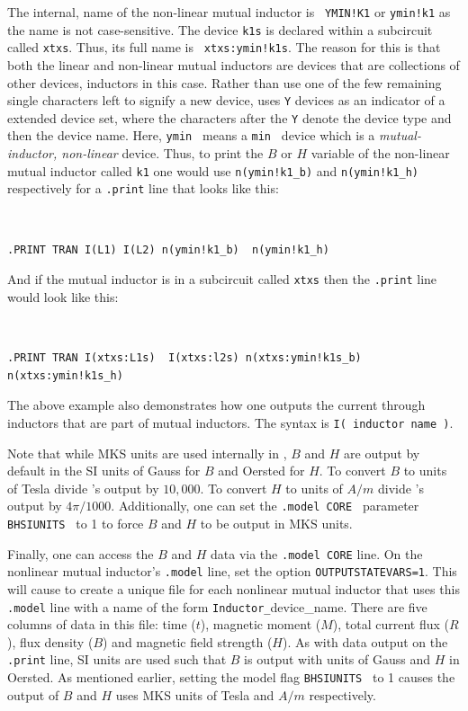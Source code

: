 The internal, \Xyce{} name of the non-linear mutual inductor is {\tt
YMIN!K1} or {\tt ymin!k1} as the name is not
case-sensitive.  The device {\tt k1s} is declared within a
subcircuit called {\tt xtxs}. Thus, its full name is {\tt
xtxs:ymin!k1s}. The reason for this is that both the linear and
non-linear mutual inductors are devices that are collections of other
devices, inductors in this case.  Rather than use one of the few
remaining single characters left to signify a new device, \Xyce{} uses
{\tt Y} devices as an indicator of a extended device set, where the
characters after the {\tt Y} denote the device type and then the device
name.  Here, {\tt ymin } means a {\tt min } device which is a {\em
mutual-inductor, non-linear} device.  Thus, to print the $B$ or $H$
variable of the non-linear mutual inductor called {\tt k1} one would
use {\tt n(ymin!k1\_b)} and {\tt n(ymin!k1\_h)}
respectively for a {\tt .print} line that looks like this:

{\tt 
\begin{verbatim}
.PRINT TRAN I(L1) I(L2) n(ymin!k1_b)  n(ymin!k1_h)  
\end{verbatim}
}

And if the mutual inductor is in a subcircuit called {\tt xtxs} then the 
{\tt .print} line would look like this:

{\tt 
\begin{verbatim}
.PRINT TRAN I(xtxs:L1s)  I(xtxs:l2s) n(xtxs:ymin!k1s_b) n(xtxs:ymin!k1s_h)
\end{verbatim}
}

The above example also demonstrates how one outputs the current through inductors 
that are part of mutual inductors.  
The syntax is {\tt I( inductor name )}.

Note that while MKS units are used internally in \Xyce{}, $B$ and $H$ are output
by default in the SI units of Gauss for $B$ and Oersted for $H$.
To convert $B$ to units of Tesla divide  \Xyce{}'s output by $10,000$.  
To convert $H$ to units of $A/m$ divide  \Xyce{}'s output by $4\pi/1000$. 
Additionally, one can set the {\tt .model CORE }
parameter {\tt BHSIUNITS } to 1 to force $B$ and $H$ to be output in MKS
units. 


Finally, one can access the $B$ and $H$ data via the {\tt .model
CORE} line. On the nonlinear mutual inductor's {\tt .model} line, set the
option {\tt OUTPUTSTATEVARS=1}. This will cause \Xyce{} to create a unique
file for each nonlinear mutual inductor that uses this {\tt .model} line
with a name of the form {\tt Inductor\_}device\_name.  There are five
columns of data in this file: time ($t$), magnetic moment ($M$), total
current flux ($R$), flux density ($B$) and magnetic field strength
($H$).  As with data output on the {\tt .print} line, SI units are used
such that $B$ is output with units of Gauss and $H$ in Oersted.  As
mentioned earlier, setting the model flag {\tt BHSIUNITS } to 1 causes
the output of $B$ and $H$ uses MKS units of Tesla and $A/m$
respectively. 

